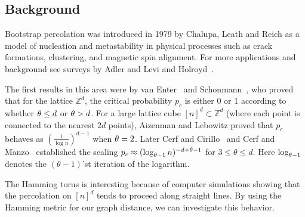 \subsection{Background}
Bootstrap percolation was introduced in 1979 by Chalupa, Leath and Reich \cite{bethe} as a model of nucleation and metastability in physical processes such as crack formations, clustering, and magnetic spin alignment.
For more applications and background see surveys by Adler and Levi \cite{brazil} and Holroyd~\cite{holroyd-survey}.

The first results in this area were by van Enter~\cite{vanenter} and Schonmann~\cite{schonmann}, who proved that for the lattice $\mathbb{Z}^d$, the critical probability $p_c$ is either 0 or 1 according to whether $\theta \le d$ or $\theta > d$. 
For a large lattice cube $[n]^d\subset \mathbb{Z}^d$ (where each point is connected to the nearest $2d$ points), Aizenman and Lebowitz \cite{aizenman} proved that $p_c$ behaves as $(\frac{1}{\log n})^{d-1}$ when $\theta=2$.
Later Cerf and Cirillo~\cite{cerfcirillo} and Cerf and Manzo~\cite{cerfmanzo} established the scaling $p_c \approx (\log_{\theta-1} n)^{-d+\theta-1}$ for $3\le \theta\le d$.
Here $\log_{\theta-1}$ denotes the $(\theta-1)$'st iteration of the logarithm. 

The Hamming torus is interesting because of computer simulations showing that the percolation on $[n]^d$ tends to proceed along straight lines.
By using the Hamming metric for our graph distance, we can investigate this behavior.

